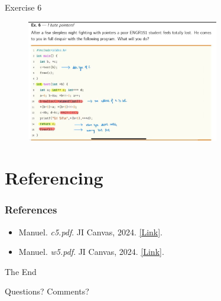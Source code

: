 \documentclass[
	11pt, %
]{beamer}
\begin{document}
\begin{frame}{Exercise 6}
    \begin{figure}
		\includegraphics[width=0.75\textwidth]{ex6.jpg}
	\end{figure}
\end{frame}

\section{Referencing}

\begin{frame} %
	\frametitle{References}
	
	\begin{itemize}
    \item Manuel. \textit{c5.pdf}. JI Canvas, 2024. \href{https://jicanvas.com/courses/917/files/folder/lectures?preview=333615}{[Link]}.

    \item Manuel. \textit{w5.pdf}. JI Canvas, 2024. \href{https://jicanvas.com/courses/917/files/folder/worksheets?preview=333633}{[Link]}.
\end{itemize}
\end{frame}


\begin{frame}[plain] %
	\begin{center}
		{\Huge The End}
		
		\bigskip\bigskip %
		
		{\LARGE Questions? Comments?}
	\end{center}
\end{frame}

\end{document}
